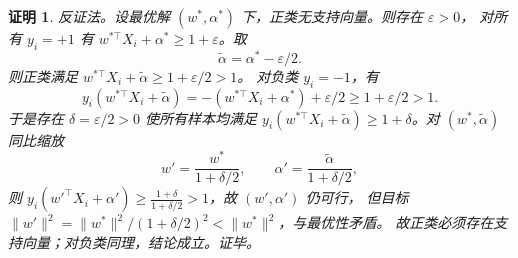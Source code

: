 \documentclass[11pt]{ctexart}
\newtheorem*{solution}{证明}
\begin{document}
\begin{solution}
反证法。设最优解 $(w^{*},\alpha^{*})$ 下，正类无支持向量。则存在 $\varepsilon>0$，
对所有 $y_i=+1$ 有 $w^{*\top}X_i+\alpha^{*}\ge 1+\varepsilon$。取
\[
\tilde\alpha=\alpha^{*}-\varepsilon/2.
\]
则正类满足 $w^{*\top}X_i+\tilde\alpha\ge 1+\varepsilon/2>1$。
对负类 $y_i=-1$，有
\[
y_i(w^{*\top}X_i+\tilde\alpha)=-(w^{*\top}X_i+\alpha^{*})+\varepsilon/2\ge 1+\varepsilon/2>1.
\]
于是存在 $\delta=\varepsilon/2>0$ 使所有样本均满足
$y_i(w^{*\top}X_i+\tilde\alpha)\ge 1+\delta$。对 $(w^{*},\tilde\alpha)$ 同比缩放
\[
w'=\frac{w^{*}}{1+\delta/2},\qquad \alpha'=\frac{\tilde\alpha}{1+\delta/2},
\]
则 $y_i(w'^\top X_i+\alpha')\ge \frac{1+\delta}{1+\delta/2}>1$，故 $(w',\alpha')$ 仍可行，
但目标 $\|w'\|^2=\|w^{*}\|^2/(1+\delta/2)^2<\|w^{*}\|^2$，与最优性矛盾。
故正类必须存在支持向量；对负类同理，结论成立。证毕。
\end{solution}
\end{document}
